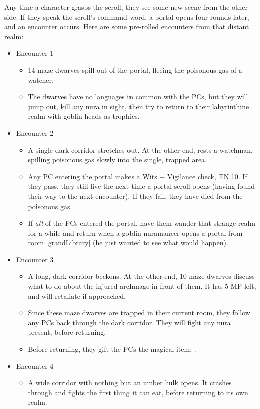 \begin{multicols}{2}
Any time a character grasps the scroll, they see some new scene from the other side.
If they speak the scroll's command word, a portal opens four rounds later, and an encounter occurs.
Here are some pre-rolled encounters from that distant realm:

\needspace{4em}
\begin{itemize}

  \item{Encounter 1}
  \begin{itemize}
    \item{14 maze-dwarves spill out of the portal, fleeing the poisonous gas of a watcher.}
    \item{The dwarves have no languages in common with the PCs, but they will jump out, kill any nura in sight, then try to return to their labyrinthine realm with goblin heads as trophies.}
  \end{itemize}
  \item{Encounter 2}
  \begin{itemize}
    \item{A single dark corridor stretches out.  At the other end, rests a watchman, spilling poisonous gas slowly into the single, trapped area.}
    \item
    Any PC entering the portal makes a Wits + Vigilance check, TN 10. If they pass, they still live the next time a portal scroll opens (having found their way to the next encounter). If they fail, they have died from the poisonous gas.
    \item
    If \emph{all} of the PCs entered the portal, have them wander that strange realm for a while and return when a goblin nuramancer opens a portal from room \ref{grandLibrary}\iftoggle{oneshot}{}{ of the lower warren} (he just wanted to see what would happen).
  \end{itemize}
  \item{Encounter 3}
  \begin{itemize}
    \item{A long, dark corridor beckons. At the other end, 10 maze dwarves discuss what to do about the injured archmage in front of them. It has 5 MP left, and will retaliate if approached.}
    \item{Since these maze dwarves are trapped in their current room, they follow any PCs back through the dark corridor.  They will fight any nura present, before returning.}
    \item
    Before returning, they gift the PCs the magical item: \lootMagic.
  \end{itemize}
  \item{Encounter 4}
  \begin{itemize}
    \item{A wide corridor with nothing but an umber hulk opens. It crashes through and fights the first thing it can eat, before returning to its own realm.}
  \end{itemize}
\end{itemize}

\end{multicols}

